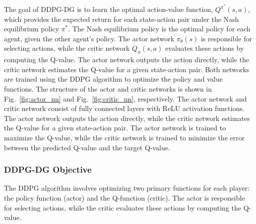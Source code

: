 \documentclass[conference]{IEEEtran}
\begin{document}
 The goal of DDPG-DG is to learn the optimal action-value function, \( Q^{\pi^*}(s, a) \), which provides the expected return for each state-action pair under the Nash equilibrium policy \( \pi^* \). The Nash equilibrium policy is the optimal policy for each agent, given the other agent's policy. 
The actor network \( \pi_{\theta}(s) \) is responsible for selecting actions, while the critic network \( Q_{\phi}(s, a) \) evaluates these actions by computing the Q-value. The actor network outputs the action directly, while the critic network estimates the Q-value for a given state-action pair. Both networks are trained using the DDPG algorithm to optimize the policy and value functions.
The structure of the actor and critic networks is shown in Fig.~\ref{fig:actor_nn} and Fig.~\ref{fig:critic_nn}, respectively. The actor network and critic network consist of fully connected layers with ReLU activation functions. The actor network outputs the action directly, while the critic network estimates the Q-value for a given state-action pair. The actor network is trained to maximize the Q-value, while the critic network is trained to minimize the error between the predicted Q-value and the target Q-value.


\subsubsection{DDPG-DG Objective}

The DDPG algorithm involves optimizing two primary functions for each player: the policy function (actor) and the Q-function (critic). The actor is responsible for selecting actions, while the critic evaluates these actions by computing the Q-value.


\end{document}
